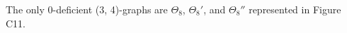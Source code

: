 The only 0-deficient (3, 4)-graphs are $\Theta_8$, $\Theta_8'$, and $\Theta_8''$ represented in Figure C11.
